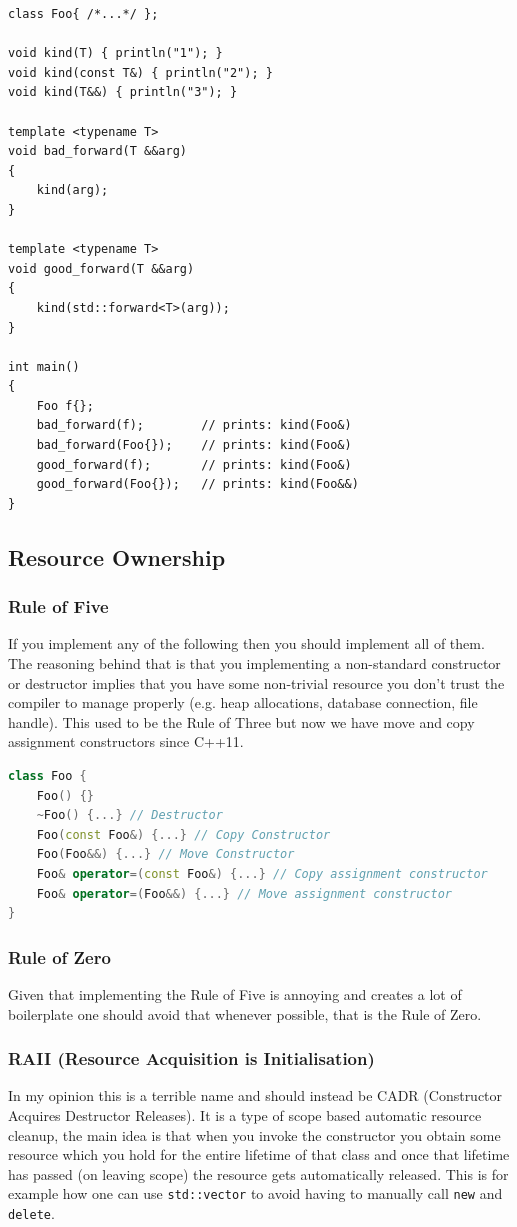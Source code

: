 \documentclass{article}
\begin{document}
\begin{lstlisting}
class Foo{ /*...*/ };

void kind(T) { println("1"); }
void kind(const T&) { println("2"); }
void kind(T&&) { println("3"); }

template <typename T>
void bad_forward(T &&arg)
{
    kind(arg);
}

template <typename T>
void good_forward(T &&arg)
{
    kind(std::forward<T>(arg));
}

int main()
{
    Foo f{};
    bad_forward(f);        // prints: kind(Foo&)
    bad_forward(Foo{});    // prints: kind(Foo&)
    good_forward(f);       // prints: kind(Foo&)
    good_forward(Foo{});   // prints: kind(Foo&&)
}
\end{lstlisting}

\subsection{Resource Ownership}
\subsubsection{Rule of Five}
If you implement any of the following then you should implement all of them. The reasoning behind that is that you implementing a non-standard constructor or destructor implies that you have some non-trivial resource you don't trust the compiler to manage properly (e.g. heap allocations, database connection, file handle). This used to be the Rule of Three but now we have move and copy assignment constructors since C++11.
\begin{lstlisting}[language=cpp,caption={Rule of 5}]
class Foo {
    Foo() {}
    ~Foo() {...} // Destructor
    Foo(const Foo&) {...} // Copy Constructor
    Foo(Foo&&) {...} // Move Constructor
    Foo& operator=(const Foo&) {...} // Copy assignment constructor
    Foo& operator=(Foo&&) {...} // Move assignment constructor
}
\end{lstlisting}

\subsubsection{Rule of Zero}
Given that implementing the Rule of Five is annoying and creates a lot of boilerplate one should avoid that whenever possible, that is the Rule of Zero.

\subsubsection{RAII (Resource Acquisition is Initialisation)}
In my opinion this is a terrible name and should instead be CADR (Constructor Acquires Destructor Releases). It is a type of scope based automatic resource cleanup, the main idea is that when you invoke the constructor you obtain some resource which you hold for the entire lifetime of that class and once that lifetime has passed (on leaving scope) the resource gets automatically released. This is for example how one can use \texttt{std::vector} to avoid having to manually call \texttt{new} and \texttt{delete}.
\end{document}
